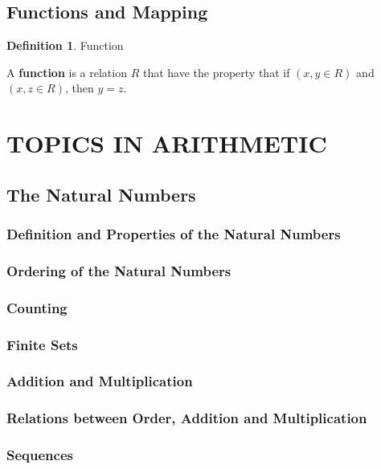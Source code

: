 \documentclass{book}
\theoremstyle{definition}
\newtheorem{definition}{Definition}[section]
\theoremstyle{remark}
\begin{document}
\section{Functions and Mapping}
    
    \begin{definition}
    Function \\
    
        \begin{tcolorbox}
            A \textbf{function} is a relation $R$ that have the property that if $(x,y \in R)$ and $(x,z \in R )$, then $y=z$. 
        \end{tcolorbox}
    \end{definition}









\newpage
\chapter{TOPICS IN ARITHMETIC}

\section{The Natural Numbers}
\subsection{Definition and Properties of the Natural Numbers}
\subsection{Ordering of the Natural Numbers}
\subsection{Counting}
\subsection{Finite Sets}
\subsection{Addition and Multiplication}
\subsection{Relations between Order, Addition and Multiplication}
\subsection{Sequences}
\end{document}
